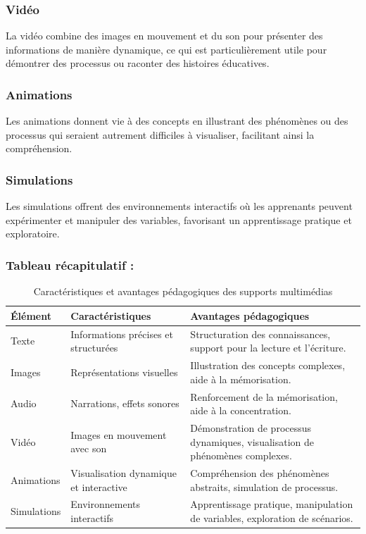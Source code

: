 \documentclass[a4paper,oneside,12pt]{book}
\renewcommand\arraystretch{1.5}
\begin{document}
\subsubsection*{Vidéo}
La vidéo combine des images en mouvement et du son pour présenter des informations de manière dynamique, ce qui est particulièrement utile pour démontrer des processus ou raconter des histoires éducatives.

\subsubsection*{Animations}
Les animations donnent vie à des concepts en illustrant des phénomènes ou des processus qui seraient autrement difficiles à visualiser, facilitant ainsi la compréhension.

\subsubsection*{Simulations}
Les simulations offrent des environnements interactifs où les apprenants peuvent expérimenter et manipuler des variables, favorisant un apprentissage pratique et exploratoire.
\subsubsection*{Tableau récapitulatif :}
\begin{table}[H]
	\centering
	\renewcommand{\arraystretch}{1.3}
	\begin{tabular}{|l|p{6cm}|p{7cm}|}
		\hline
		\textbf{Élément} & \textbf{Caractéristiques} & \textbf{Avantages pédagogiques} \\
		\hline
		Texte & Informations précises et structurées & Structuration des connaissances, support pour la lecture et l'écriture. \\
		\hline
		Images & Représentations visuelles & Illustration des concepts complexes, aide à la mémorisation. \\
		\hline
		Audio & Narrations, effets sonores & Renforcement de la mémorisation, aide à la concentration. \\
		\hline
		Vidéo & Images en mouvement avec son & Démonstration de processus dynamiques, visualisation de phénomènes complexes. \\
		\hline
		Animations & Visualisation dynamique et interactive & Compréhension des phénomènes abstraits, simulation de processus. \\
		\hline
		Simulations & Environnements interactifs & Apprentissage pratique, manipulation de variables, exploration de scénarios. \\
		\hline
	\end{tabular}
	\caption{Caractéristiques et avantages pédagogiques des supports multimédias}
	\label{tab:supports_pedagogiques}
\end{table}
\end{document}
